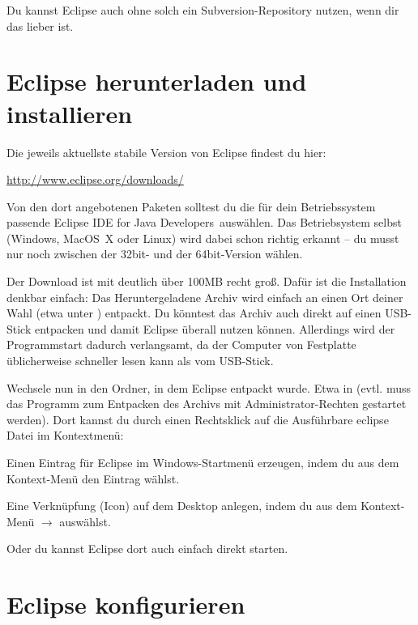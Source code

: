 Du kannst Eclipse auch ohne solch ein Subversion-Repository nutzen, wenn dir
das lieber ist.

\afterpage{\clearpage}

\section{Eclipse herunterladen und installieren}

Die jeweils aktuellste stabile Version von Eclipse findest du hier:	

\url{http://www.eclipse.org/downloads/}

Von den dort angebotenen Paketen solltest du die für dein Betriebssystem
passende \glqq Eclipse IDE for Java Developers\grqq\ auswählen. Das
Betriebsystem selbst (Windows, \mbox{MacOS X} oder Linux) wird dabei schon
richtig erkannt -- du musst nur noch zwischen der 32bit- und der 64bit-Version
wählen.

Der Download ist mit deutlich über 100MB recht groß. Dafür ist die Installation
denkbar einfach: Das Heruntergeladene Archiv wird einfach an einen Ort deiner
Wahl (etwa unter ) entpackt. Du könntest das
Archiv auch direkt auf einen USB-Stick entpacken und damit Eclipse überall
nutzen können. Allerdings wird der Programmstart dadurch verlangsamt, da der
Computer von Festplatte üblicherweise schneller lesen kann als vom USB-Stick.

Wechsele nun in den Ordner, in dem Eclipse entpackt wurde. Etwa in
 (evtl. muss das
Programm zum Entpacken des Archivs mit Administrator-Rechten gestartet werden).
Dort kannst du durch einen Rechtsklick auf die Ausführbare eclipse Datei im
Kontextmenü:

\begin{compactitem}

\item Einen Eintrag für Eclipse im Windows-Startmenü erzeugen, indem du aus dem
Kontext-Menü den Eintrag  wählst.

\item Eine Verknüpfung (Icon) auf dem Desktop anlegen, indem du aus dem
Kontext-Menü  $\rightarrow$  auswählst.

\end{compactitem}

Oder du kannst Eclipse dort auch einfach direkt starten.

\section{Eclipse konfigurieren}

